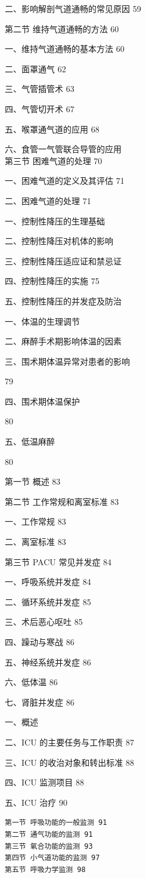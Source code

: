\documentclass[10pt]{article}
\begin{document}
二、影响解剖气道通畅的常见原因 59

第二节 维持气道通畅的方法 60

一、维持气道通畅的基本方法 60

二、面罩通气 62

三、气管插管术 63

四、气管切开术 67

五、喉罩通气道的应用 68

六、食管一气管联合导管的应用\\
第三节 困难气道的处理 70

一、困难气道的定义及其评估 71

二、困难气道的处理 71

一、控制性降压的生理基础

二、控制性降压对机体的影响

三、控制性降压适应证和禁忌证

四、控制性降压的实施 75

五、控制性降压的并发症及防治

一、体温的生理调节

二、麻醉手术期影响体温的因素

三、围术期体温异常对患者的影响

79

四、围术期体温保护

80

五、低温麻醉

80

第一节 概述 83

第二节 工作常规和离室标准 83

一、工作常规 83

二、离室标准 83

第三节 PACU 常见并发症 84

一、呼吸系统并发症 84

二、循环系统并发症 85

三、术后恶心呕吐 85

四、躁动与寒战 86

五、神经系统并发症 86

六、低体温 86

七、肾脏并发症 86

一、概述

二、ICU 的主要任务与工作职责 87

三、ICU 的收治对象和转出标准 88

四、ICU 监测项目 88

五、ICU 治疗 90

\begin{verbatim}
第一节 呼吸功能的一般监测 91
第二节 通气功能的监测 91
第三节 氧合功能的监测 93
第四节 小气道功能的监测 97
第五节 呼吸力学监测 98
\end{verbatim}
\end{document}
